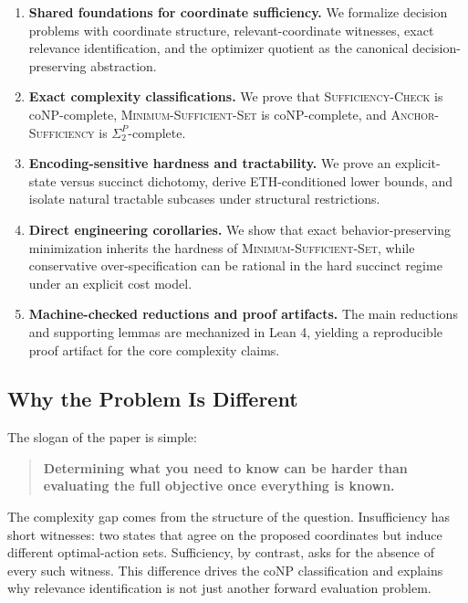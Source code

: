 \begin{enumerate}
\item \textbf{Shared foundations for coordinate sufficiency.} We formalize decision problems with coordinate structure, relevant-coordinate witnesses, exact relevance identification, and the optimizer quotient as the canonical decision-preserving abstraction.

\item \textbf{Exact complexity classifications.} We prove that \textsc{Sufficiency-Check} is coNP-complete, \textsc{Minimum-Sufficient-Set} is coNP-complete, and \textsc{Anchor-Sufficiency} is $\Sigma_2^P$-complete.

\item \textbf{Encoding-sensitive hardness and tractability.} We prove an explicit-state versus succinct dichotomy, derive ETH-conditioned lower bounds, and isolate natural tractable subcases under structural restrictions.

\item \textbf{Direct engineering corollaries.} We show that exact behavior-preserving minimization inherits the hardness of \textsc{Minimum-Sufficient-Set}, while conservative over-specification can be rational in the hard succinct regime under an explicit cost model.

\item \textbf{Machine-checked reductions and proof artifacts.} The main reductions and supporting lemmas are mechanized in Lean 4, yielding a reproducible proof artifact for the core complexity claims.
\end{enumerate}

\subsection{Why the Problem Is Different}

The slogan of the paper is simple:
\begin{quote}
\textbf{Determining what you need to know can be harder than evaluating the full objective once everything is known.}
\end{quote}

The complexity gap comes from the structure of the question. Insufficiency has short witnesses: two states that agree on the proposed coordinates but induce different optimal-action sets. Sufficiency, by contrast, asks for the absence of every such witness. This difference drives the coNP classification and explains why relevance identification is not just another forward evaluation problem.

